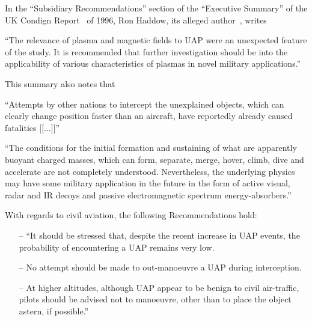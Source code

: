 In the ``Subsidiary Recommendations'' section of the ``Executive Summary'' of the UK Condign Report~\cite{CondignReport} of 1996,
Ron Haddow, its alleged author~\cite{Clarke2022Nov}, writes
\begin{svgraybox}
``The relevance of plasma and magnetic fields to UAP were an unexpected feature of
the study. It is recommended that further investigation should be into the
applicability of various characteristics of plasmas in novel military applications.''
\end{svgraybox}

This summary also notes that
\begin{svgraybox}
``Attempts by other nations to intercept the unexplained objects, which can
clearly change position faster than an aircraft, have reportedly already caused
fatalities  [[$\ldots$]]''

 ``The conditions for the initial formation and sustaining of what are apparently
buoyant charged masses, which can form, separate, merge, hover, climb, dive and
accelerate are not completely understood. Nevertheless, the underlying physics may
have some military application in the future in the form of active visual, radar and IR
decoys and passive electromagnetic spectrum energy-absorbers.''
\end{svgraybox}

With regards to civil aviation, the following Recommendations hold:
\begin{svgraybox}
\begin{itemize}
\item[--] ``It should be stressed that, despite the recent increase in UAP events, the
probability of encountering a UAP remains very low.
\item[--]  No attempt should be made to out-manoeuvre a UAP during interception.
\item[--]  At higher altitudes, although UAP appear to be benign to civil air-traffic,
pilots should be advised not to manoeuvre, other than to place the object
astern, if possible.''
\end{itemize}
\end{svgraybox}

